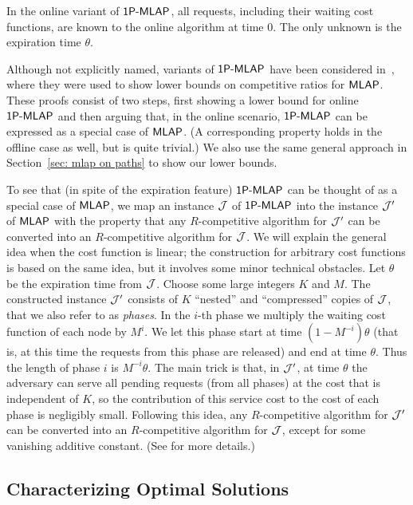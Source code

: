 \documentclass[a4paper]{article}
\newcommand{\calJ}{{\cal J}}
\newcommand{\MLAP}{\mbox{\rm\textsf{MLAP}}}
\newcommand{\SPMLAP}{\mbox{\rm\textsf{1P-MLAP}}}
\newcommand{\expiration}{\theta}
\begin{document}
In the online variant of $\SPMLAP$, all requests, including their waiting cost functions,
are known to the online algorithm at time $0$. The only unknown is the expiration time $\expiration$.

Although not explicitly named, variants of $\SPMLAP$ have
been considered in~\cite{jrp-online-buchbinder,aggregation_wads_2013}, where they 
were used to show lower bounds on competitive ratios for $\MLAP$. These proofs
consist of two steps, first showing a lower bound for online $\SPMLAP$ and then arguing
that, in the online scenario, $\SPMLAP$ can be expressed as a special case of $\MLAP$.
(A corresponding property holds in the offline case as well, but is quite trivial.)
We also use the same general approach in Section~\ref{sec: mlap on paths} to show our lower bounds.

To see that (in spite of the expiration feature) $\SPMLAP$ can be thought of as a special case
of $\MLAP$, we map an instance $\calJ$ of $\SPMLAP$ into the instance
$\calJ'$ of $\MLAP$ with the property that any $R$-competitive algorithm for $\calJ'$
can be converted into an $R$-competitive algorithm for $\calJ$.
We will explain the general idea when the cost function is linear; the construction
for arbitrary cost functions is based on the same idea, but it involves some minor
technical obstacles. Let $\expiration$ be the expiration time from $\calJ$.
Choose some large integers $K$ and $M$.  The constructed instance 
$\calJ'$ consists of $K$ ``nested'' and ``compressed'' copies of $\calJ$, that we
also refer to as \emph{phases}.
In the $i$-th phase we multiply the waiting cost function of each node by $M^i$. 
We let this phase start at time $(1-M^{-i})\expiration$
(that is, at this time the requests from this phase are released) and
end at time $\expiration$. Thus the length of phase $i$ is $M^{-i}\expiration$.
The main trick is that, in $\calJ'$, at time $\expiration$ the adversary can serve
all pending requests (from all phases) at the cost that is independent of $K$, 
so the contribution of this service cost to the cost of each phase is negligibly small. 
Following this idea, any $R$-competitive
algorithm for $\calJ'$ can be converted into an $R$-competitive algorithm
for $\calJ$, except for some vanishing additive constant.
(See \cite{jrp-online-buchbinder,aggregation_wads_2013} for more details.)



\subsection{Characterizing Optimal Solutions}
\end{document}
